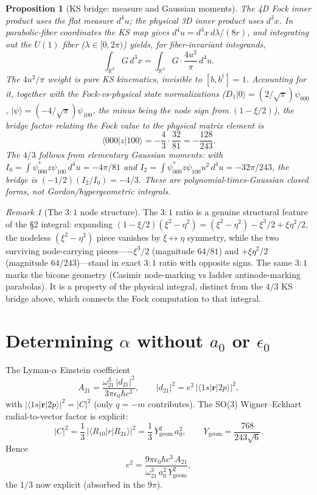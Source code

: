 \documentclass[11pt]{amsart}
\newtheorem{proposition}[theorem]{Proposition}
\theoremstyle{remark}
\newtheorem*{remark}{Remark}
\begin{document}
\begin{proposition}[KS bridge: measure and Gaussian moments]
The 4D Fock inner product uses the flat measure $d^4u$; the physical
3D inner product uses $d^3x$.  In parabolic-fiber coordinates the KS
map gives $d^4u=d^3x\,d\lambda/(8r)$, and integrating out the $U(1)$
fiber ($\lambda\in[0,2\pi)$) yields, for fiber-invariant integrands,
\begin{equation}
\int_{\mathbb{R}^3} G\,d^3x = \int_{\mathbb{R}^4} G\cdot\frac{4u^2}{\pi}\,d^4u.
\end{equation}
The $4u^2/\pi$ weight is pure KS kinematics, invisible to
$[b,b^\dagger]=1$.  Accounting for it, together with the Fock-vs-physical
state normalizations ($D_1|0\rangle=(2/\sqrt\pi)\psi_{000}$,
$|\psi\rangle=(-4/\sqrt\pi)\psi_{100}$, the minus being the node sign
from $(1-\xi/2)$), the bridge factor relating the Fock value to the
physical matrix element is
\begin{equation}
\boxed{\langle000|z|100\rangle
= -\frac{4}{3}\cdot\frac{32}{81} = -\frac{128}{243}.}
\end{equation}
The $4/3$ follows from elementary Gaussian moments: with
$I_0=\int\psi_{000}^*z\psi_{100}\,d^4u=-4\pi/81$ and
$I_2=\int\psi_{000}^*z\psi_{100}u^2\,d^4u=-32\pi/243$,
the bridge is $(-1/2)(I_2/I_0)=-4/3$.  These are polynomial-times-Gaussian
closed forms, not Gordon/hypergeometric integrals.
\end{proposition}

\begin{remark}[The $3{:}1$ node structure]
The $3{:}1$ ratio is a genuine structural feature of the \S2 integral:
expanding $(1-\xi/2)(\xi^2-\eta^2)=(\xi^2-\eta^2)-\xi^3/2+\xi\eta^2/2$,
the nodeless $(\xi^2-\eta^2)$ piece vanishes by $\xi\leftrightarrow\eta$
symmetry, while the two surviving node-carrying pieces---$-\xi^3/2$
(magnitude $64/81$) and $+\xi\eta^2/2$ (magnitude $64/243$)---stand in
exact $3{:}1$ ratio with opposite signs.  The same $3{:}1$ marks the
bicone geometry (Casimir node-marking vs ladder antinode-marking
parabolas).  It is a property of the physical integral, distinct from
the $4/3$ KS bridge above, which connects the Fock computation to that
integral.
\end{remark}

\section{Determining $\alpha$ without $a_0$ or $\epsilon_0$}

The Lyman-$\alpha$ Einstein coefficient
\[
A_{21}=\frac{\omega_{21}^3\,|d_{21}|^2}{3\pi\epsilon_0\hbar c^3},
\qquad |d_{21}|^2=e^2\,|\langle1s|\mathbf r|2p\rangle|^2,
\]
with $|\langle1s|\mathbf r|2p\rangle|^2=|C|^2$ (only $q=-m$ contributes).
The SO(3) Wigner--Eckhart radial-to-vector factor is explicit:
\[
|C|^2=\frac13\,|\langle R_{10}|r|R_{21}\rangle|^2
=\frac13\,Y_{\mathrm{geom}}^2\,a_0^2,
\qquad
Y_{\mathrm{geom}}=\frac{768}{243\sqrt6}.
\]
Hence
\begin{equation}\label{eq:e2}
e^2=\frac{9\pi\epsilon_0\hbar c^3\,A_{21}}
{\omega_{21}^3\,a_0^2\,Y_{\mathrm{geom}}^2},
\end{equation}
the $1/3$ now explicit (absorbed in the $9\pi$).
\end{document}
